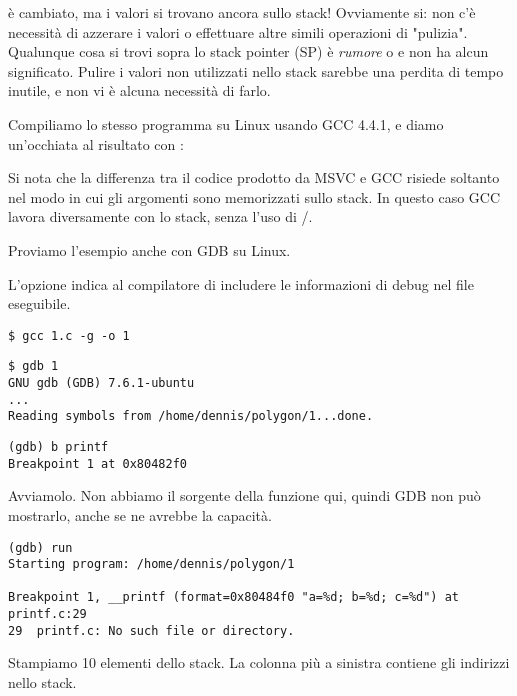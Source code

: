 \ESP è cambiato, ma i valori si trovano ancora sullo stack!
Ovviamente si: non c'è necessità di azzerare i valori o effettuare altre simili operazioni di "pulizia".
Qualunque cosa si trovi sopra lo stack pointer (\ac{SP})
è \emph{rumore} o \emph{\garbage{}} e non ha alcun significato.
Pulire i valori non utilizzati nello stack sarebbe una perdita di tempo inutile, e non vi è alcuna necessità di farlo.



Compiliamo lo stesso programma su Linux usando GCC 4.4.1, e diamo un'occhiata al risultato con \IDA:



Si nota che la differenza tra il codice prodotto da MSVC e GCC risiede soltanto nel modo in cui gli argomenti sono memorizzati sullo stack.
In questo caso GCC lavora diversamente con lo stack, senza l'uso di \PUSH/\POP.


Proviamo l'esempio anche con \ac{GDB} su Linux.

L'opzione  indica al compilatore di includere le informazioni di debug nel file eseguibile.

\begin{lstlisting}
$ gcc 1.c -g -o 1
\end{lstlisting}

\begin{lstlisting}
$ gdb 1
GNU gdb (GDB) 7.6.1-ubuntu
...
Reading symbols from /home/dennis/polygon/1...done.
\end{lstlisting}

\begin{lstlisting}[caption=impostiamo un breakpoint su \printf]
(gdb) b printf
Breakpoint 1 at 0x80482f0
\end{lstlisting}

Avviamolo.
Non abbiamo il sorgente della funzione \printf qui, quindi \ac{GDB} non può mostrarlo, anche se ne avrebbe la capacità.

\begin{lstlisting}
(gdb) run
Starting program: /home/dennis/polygon/1

Breakpoint 1, __printf (format=0x80484f0 "a=%d; b=%d; c=%d") at printf.c:29
29	printf.c: No such file or directory.
\end{lstlisting}

Stampiamo 10 elementi dello stack. La colonna più a sinistra contiene gli indirizzi nello stack.


